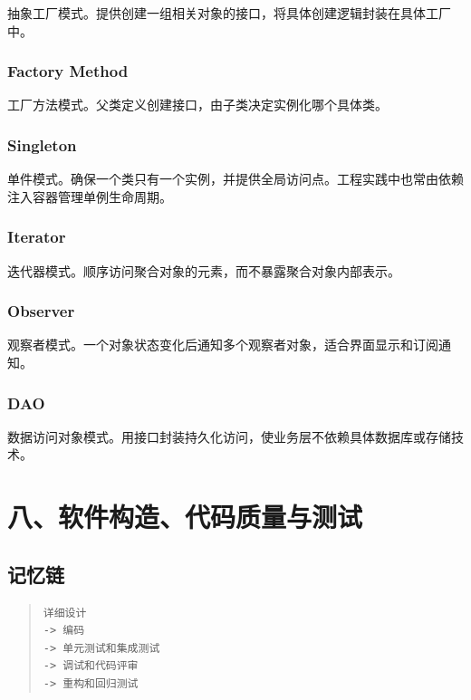 \documentclass[UTF8,zihao=-4]{ctexart}
\begin{document}
抽象工厂模式。提供创建一组相关对象的接口，将具体创建逻辑封装在具体工厂中。


\subsubsection*{Factory Method}


工厂方法模式。父类定义创建接口，由子类决定实例化哪个具体类。


\subsubsection*{Singleton}


单件模式。确保一个类只有一个实例，并提供全局访问点。工程实践中也常由依赖注入容器管理单例生命周期。


\subsubsection*{Iterator}


迭代器模式。顺序访问聚合对象的元素，而不暴露聚合对象内部表示。


\subsubsection*{Observer}


观察者模式。一个对象状态变化后通知多个观察者对象，适合界面显示和订阅通知。


\subsubsection*{DAO}


数据访问对象模式。用接口封装持久化访问，使业务层不依赖具体数据库或存储技术。


\section{八、软件构造、代码质量与测试}


\subsection{记忆链}


\begin{quote}
\footnotesize
\begin{verbatim}
详细设计
-> 编码
-> 单元测试和集成测试
-> 调试和代码评审
-> 重构和回归测试
\end{verbatim}
\end{quote}
\end{document}
